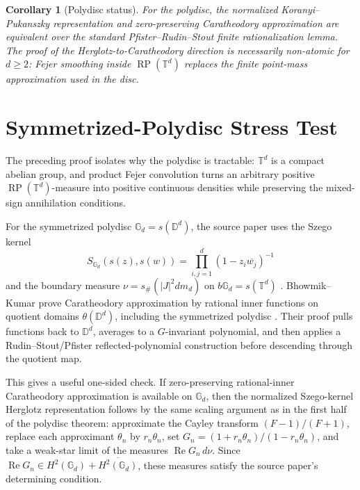 \documentclass[11pt]{article}
\newtheorem{corollary}{Corollary}
\newcommand{\D}{\mathbb D}
\newcommand{\T}{\mathbb T}
\newcommand{\RP}{\operatorname{RP}}
\begin{document}
\begin{corollary}[Polydisc status]
For the polydisc, the normalized Koranyi--Pukanszky representation and
zero-preserving Caratheodory approximation are equivalent over the standard
Pfister--Rudin--Stout finite rationalization lemma.  The proof of the
Herglotz-to-Caratheodory direction is necessarily non-atomic for \(d\geq2\):
Fejer smoothing inside \(\RP(\T^d)\) replaces the finite point-mass
approximation used in the disc.
\end{corollary}

\section*{Symmetrized-Polydisc Stress Test}

The preceding proof isolates why the polydisc is tractable: \(\T^d\) is a
compact abelian group, and product Fejer convolution turns an arbitrary
positive \(\RP(\T^d)\)-measure into positive continuous densities while
preserving the mixed-sign annihilation conditions.

For the symmetrized polydisc \(\mathbb G_d=s(\D^d)\), the source paper uses
the Szego kernel
\[
  S_{\mathbb G_d}(s(z),s(w))=\prod_{i,j=1}^d(1-z_i\overline{w_j})^{-1}
\]
and the boundary measure \(\nu=s_\#(|J|^2dm_d)\) on
\(b\mathbb G_d=s(\T^d)\) \cite[p. 19]{BBK}.  Bhowmik--Kumar prove
Caratheodory approximation by rational inner functions on quotient domains
\(\theta(\D^d)\), including the symmetrized polydisc
\cite[Theorem C]{BKquot}.  Their proof pulls functions back to
\(\D^d\), averages to a \(G\)-invariant polynomial, and then applies a
Rudin--Stout/Pfister reflected-polynomial construction before descending
through the quotient map.

This gives a useful one-sided check.  If zero-preserving rational-inner
Caratheodory approximation is available on \(\mathbb G_d\), then the
normalized Szego-kernel Herglotz representation follows by the same
scaling argument as in the first half of the polydisc theorem: approximate
the Cayley transform \((F-1)/(F+1)\), replace each approximant \(\theta_n\)
by \(r_n\theta_n\), set \(G_n=(1+r_n\theta_n)/(1-r_n\theta_n)\), and take a
weak-star limit of the measures
\(\operatorname{Re}G_n\,d\nu\).  Since
\(\operatorname{Re}G_n\in H^2(\mathbb G_d)+\overline{H^2(\mathbb G_d)}\),
these measures satisfy the source paper's determining condition.
\end{document}

